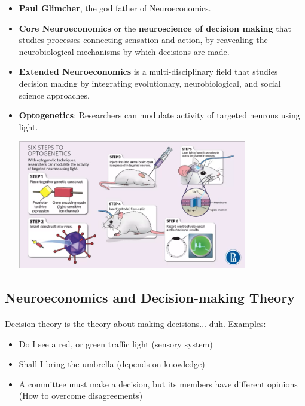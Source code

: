 \documentclass[12pt, a4paper]{article}
\begin{document}
\begin{itemize}
    \item \textbf{Paul Glimcher}, the god father of Neuroeconomics.
    \item \textbf{Core Neuroeconomics} or the \textbf{neuroscience of decision making} that studies
    processes connecting sensation and action, by reavealing the neurobiological mechanisms by which
    decisions are made.
    \item \textbf{Extended Neuroeconomics} is a multi-disciplinary field that studies decision making
    by integrating evolutionary, neurobiological, and social science approaches.
    \item \textbf{Optogenetics}: Researchers can modulate activity of targeted neurons using light.
    
    {
        \centering
        \includegraphics[width=10cm]{optogenetics steps.png}

    }
\end{itemize}

\subsection{Neuroeconomics and Decision-making Theory}

\paragraph*{}

Decision theory is the theory about making decisions... duh.
Examples:
\begin{itemize}
    \item Do I see a red, or green traffic light (sensory system)
    \item Shall I bring the umbrella (depends on knowledge)
    \item A committee must make a decision, but its members have different opinions 
    (How to overcome disagreements)
\end{itemize}
\end{document}
